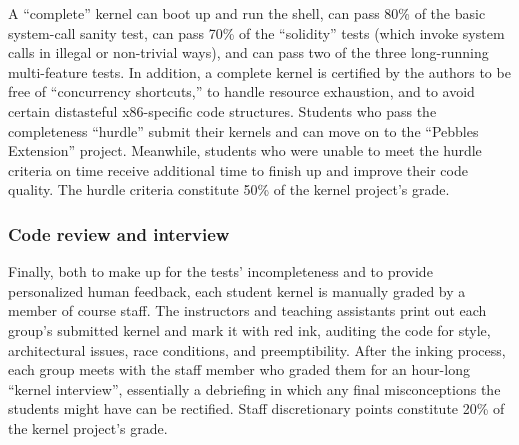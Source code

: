 A ``complete'' kernel can boot up and run the shell,
can pass 80\% of the basic system-call sanity test,
can pass 70\% of the ``solidity'' tests (which
invoke system calls in illegal or non-trivial ways),
and can pass two of the three long-running multi-feature tests.
In addition,
a complete kernel is certified by the authors to
be free of ``concurrency shortcuts,''
to handle resource exhaustion,
and to avoid certain distasteful x86-specific code structures.
%
Students who pass the completeness ``hurdle'' submit their kernels
and can move on to the ``Pebbles Extension'' project.
Meanwhile, students who were unable to meet the
hurdle criteria on time receive additional time
to finish up and improve their code quality.
The hurdle criteria constitute 50\% of the kernel project's grade.

\subsubsection{Code review and interview}

Finally, both to make up for the tests' incompleteness and to provide personalized human feedback, each student kernel is manually graded by a member of course staff.
The instructors and teaching assistants print out each group's submitted kernel and mark it with red ink, auditing the code for style, architectural issues, race conditions, and preemptibility.
After the inking process, each group meets with the staff member who graded them for an hour-long ``kernel interview'', essentially a debriefing in which any final misconceptions the students might have can be rectified.
Staff discretionary points constitute 20\% of the kernel project's grade.
